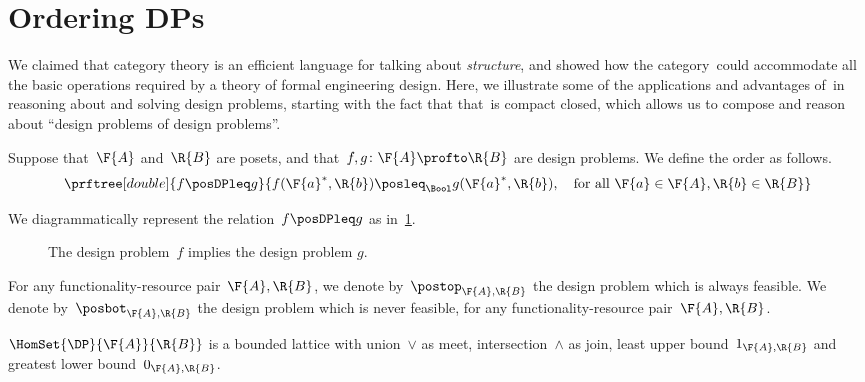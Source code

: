 \section{Ordering DPs}\label{sec:ordering-order}
We claimed that category theory is an efficient language for talking about \emph{structure}, and showed how the category~\DP could accommodate all the basic operations required by a theory of formal engineering design. Here, we illustrate some of the applications and advantages of~\DP in reasoning about and solving design problems, starting with the fact that that~\DP is compact closed, which allows us to compose and reason about ``design problems of design problems''.

\begin{definition}[Order on~\DP]
  \label{def:DP_loc_pos}
  Suppose that~$\F{A}$ and~$\R{B}$ are posets, and that~$f,g \colon \F{A} \profto \R{B}$ are design problems.
  We define the order as follows.
  \begin{equation*}
      \prftree[double]{f \posDPleq g}{f(\F{a}^*,\R{b}) \posleq_\Bool g(\F{a}^*,\R{b}), \quad \text{for all }\F{a} \in \F{A},\R{b} \in \R{B}}
  \end{equation*}


\end{definition}

We diagrammatically represent the relation~$f \posDPleq g$ as in~\cref{fig:dpimplies}.

\begin{figure}[h!]
  \begin{center}
  \end{center}
  \caption{The design problem~$f$ implies the design problem $g$. \label{fig:dpimplies}}
\end{figure}

\begin{remark}
  For any functionality-resource pair~$\F{A},\R{B}$, we denote by~$\postop_{\F{A},\R{B}}$ the design problem which is always feasible. We denote by~$\posbot_{\F{A},\R{B}}$ the design problem which is never feasible, for any functionality-resource pair~$\F{A},\R{B}$.
\end{remark}
\begin{lemma}
  \label{lem:dpboundedlattice}
  $\HomSet{\DP}{\F{A}}{\R{B}}$ is a bounded lattice with union~$\vee$ as meet, intersection~$\wedge$ as join, least upper bound~$1_{\F{A},\R{B}}$ and greatest lower bound~$0_{\F{A},\R{B}}$.
\end{lemma}

